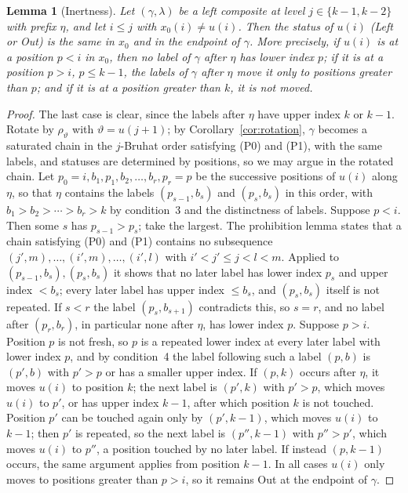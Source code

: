\documentclass[11pt]{article}
\newtheorem{lemma}[proposition]{Lemma}
\begin{document}
\begin{lemma}[Inertness]\label{lem:inert}
Let $(\gamma,\lambda)$ be a left composite at level $j\in\{k-1,k-2\}$
with prefix $\eta$, and let $i\leq j$ with $x_0(i)\neq u(i)$. Then the
status of $u(i)$ (Left or Out) is the same in $x_0$ and in the endpoint
of $\gamma$. More precisely, if $u(i)$ is at a position $p<i$ in $x_0$,
then no label of $\gamma$ after $\eta$ has lower index $p$; if it is at
a position $p>i$, $p\leq k-1$, the labels of $\gamma$ after $\eta$ move
it only to positions greater than $p$; and if it is at a position
greater than $k$, it is not moved.
\end{lemma}

\begin{proof}
The last case is clear, since the labels after $\eta$ have upper index
$k$ or $k-1$. Rotate by $\rho_\vartheta$ with $\vartheta=u(j+1)$; by
Corollary~\ref{cor:rotation}, $\gamma$ becomes a saturated chain in
the $j$-Bruhat order satisfying (P0) and (P1), with the same labels,
and statuses are determined by positions, so we may argue in the
rotated chain. Let $p_0=i,b_1,p_1,b_2,\ldots,b_r,p_r=p$ be the
successive positions of $u(i)$ along $\eta$, so that $\eta$ contains
the labels $(p_{s-1},b_s)$ and $(p_s,b_s)$ in this order, with
$b_1>b_2>\cdots>b_r>k$ by condition~3 and the distinctness of labels.
Suppose $p<i$. Then some $s$ has $p_{s-1}>p_s$; take the largest. The
prohibition lemma \cite[Lemma~2.9]{lenart2007pieri} states that a
chain satisfying (P0) and (P1) contains no subsequence
$(j',m),\ldots,(i',m),\ldots,(i',l)$ with $i'<j'\leq j<l<m$. Applied to
$(p_{s-1},b_s),(p_s,b_s)$ it shows that no later label has lower index
$p_s$ and upper index $<b_s$; every later label has upper index
$\leq b_s$, and $(p_s,b_s)$ itself is not repeated. If $s<r$ the label
$(p_s,b_{s+1})$ contradicts this, so $s=r$, and no label after
$(p_r,b_r)$, in particular none after $\eta$, has lower index $p$.
Suppose $p>i$. Position $p$ is not fresh, so $p$ is a repeated lower
index at every later label with lower index $p$, and by condition~4
the label following such a label $(p,b)$ is $(p',b)$ with $p'>p$ or
has a smaller upper index. If $(p,k)$ occurs after $\eta$, it moves
$u(i)$ to position $k$; the next label is $(p',k)$ with $p'>p$, which
moves $u(i)$ to $p'$, or has upper index $k-1$, after which position
$k$ is not touched. Position $p'$ can be touched again only by
$(p',k-1)$, which moves $u(i)$ to $k-1$; then $p'$ is repeated, so the
next label is $(p'',k-1)$ with $p''>p'$, which moves $u(i)$ to $p''$,
a position touched by no later label. If instead $(p,k-1)$ occurs, the
same argument applies from position $k-1$. In all cases $u(i)$ only
moves to positions greater than $p>i$, so it remains Out at the
endpoint of $\gamma$.
\end{proof}
\end{document}
